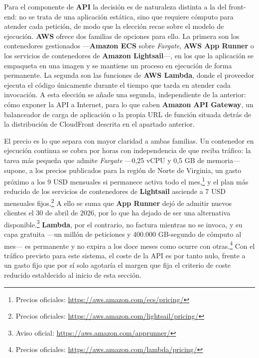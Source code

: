 Para el componente de \textbf{API} la decisión es de naturaleza distinta a la del front-end: no se trata de una aplicación estática, sino que requiere cómputo para atender cada petición, de modo que la elección recae sobre el modelo de ejecución. \textbf{AWS} ofrece dos familias de opciones para ello. La primera son los contenedores gestionados —\textbf{Amazon ECS} sobre \textit{Fargate}, \textbf{AWS App Runner} o los servicios de contenedores de \textbf{Amazon Lightsail}—, en los que la aplicación se empaqueta en una imagen y se mantiene un proceso en ejecución de forma permanente. La segunda son las funciones de \textbf{AWS Lambda}, donde el proveedor ejecuta el código únicamente durante el tiempo que tarda en atender cada invocación. A esta elección se añade una segunda, independiente de la anterior: cómo exponer la API a Internet, para lo que caben \textbf{Amazon API Gateway}, un balanceador de carga de aplicación o la propia URL de función situada detrás de la distribución de CloudFront descrita en el apartado anterior.

El precio es lo que separa con mayor claridad a ambas familias. Un contenedor en ejecución continua se cobra por horas con independencia de que reciba tráfico: la tarea más pequeña que admite \textit{Fargate} —0,25 vCPU y 0,5 GB de memoria— supone, a los precios publicados para la región de Norte de Virginia, un gasto próximo a los 9 USD mensuales si permanece activa todo el mes,\footnote{Precios oficiales: \url{https://aws.amazon.com/ecs/pricing/}} y el plan más reducido de los servicios de contenedores de \textbf{Lightsail} asciende a 7 USD mensuales fijos.\footnote{Precios oficiales: \url{https://aws.amazon.com/lightsail/pricing/}} A ello se suma que \textbf{App Runner} dejó de admitir nuevos clientes el 30 de abril de 2026, por lo que ha dejado de ser una alternativa disponible.\footnote{Aviso oficial: \url{https://aws.amazon.com/apprunner/}} \textbf{Lambda}, por el contrario, no factura mientras no se invoca, y su capa gratuita —un millón de peticiones y 400.000 GB-segundo de cómputo al mes— es permanente y no expira a los doce meses como ocurre con otras.\footnote{Precios oficiales: \url{https://aws.amazon.com/lambda/pricing/}} Con el tráfico previsto para este sistema, el coste de la API es por tanto nulo, frente a un gasto fijo que por sí solo agotaría el margen que fija el criterio de coste reducido establecido al inicio de esta sección.

